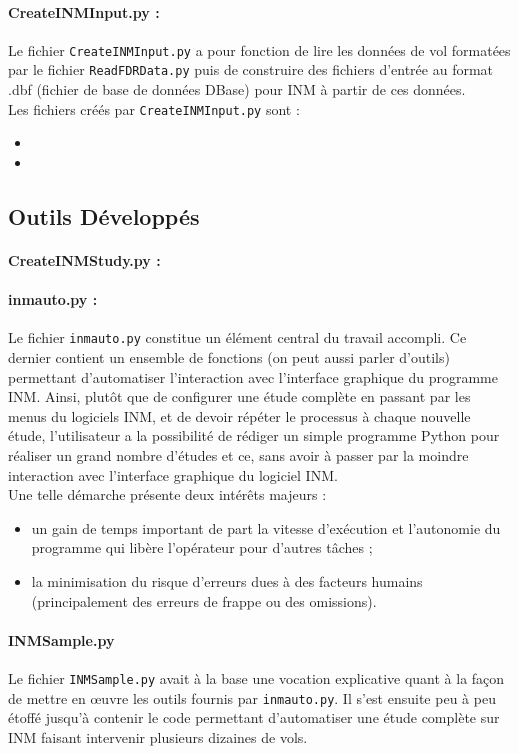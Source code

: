\documentclass[a4paper]{article}
\newcommand{\code}[1]{\texttt{#1}}
\begin{document}
\paragraph{CreateINMInput.py :}
    Le fichier \code{CreateINMInput.py} a pour fonction de lire les données de vol formatées par le fichier \code{ReadFDRData.py} puis de construire des fichiers d'entrée au format .dbf (fichier de base de données DBase) pour INM à partir de ces données.\\
    Les fichiers créés par \code{CreateINMInput.py} sont :
    \begin{itemize}
        \item 
        \item 
    \end{itemize}
    
    \subsection{Outils Développés}
    \paragraph{CreateINMStudy.py :}
    \paragraph{inmauto.py :}
    Le fichier \code{inmauto.py} constitue un élément central du travail accompli. Ce dernier contient un ensemble de fonctions (on peut aussi parler d'outils) permettant d'automatiser l'interaction avec l'interface graphique du programme INM. Ainsi, plutôt que de configurer une étude complète en passant par les menus du logiciels INM, et de devoir répéter le processus à chaque nouvelle étude, l'utilisateur a la possibilité de rédiger un simple programme Python pour réaliser un grand nombre d'études et ce, sans avoir à passer par la moindre interaction avec l'interface graphique du logiciel INM.\\
    Une telle démarche présente deux intérêts majeurs :
    \begin{itemize}
        \item un gain de temps important de part la vitesse d'exécution et l'autonomie du programme qui libère l'opérateur pour d'autres tâches ;
        \item la minimisation du risque d'erreurs dues à des facteurs humains (principalement des erreurs de frappe ou des omissions).
    \end{itemize}
    \paragraph{INMSample.py}
    Le fichier \code{INMSample.py} avait à la base une vocation explicative quant à la façon de mettre en \oe uvre les outils fournis par \code{inmauto.py}. Il s'est ensuite peu à peu étoffé jusqu'à contenir le code permettant d'automatiser une étude complète sur INM faisant intervenir plusieurs dizaines de vols.
\end{document}
